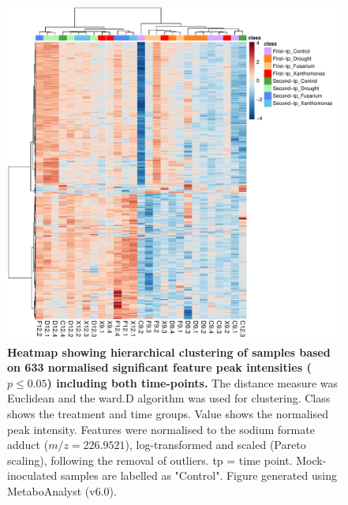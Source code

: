 \begin{figure}[p!]
  \centering
  \includegraphics[width=\textwidth]{Figures/Sig633FeaturesRedSamplesRedGroups_ForThesis.pdf}
  \caption[Heatmap showing hierarchical clustering of samples based on 633 normalised significant feature peak intensities ($p \le0.05$).]{\textbf{Heatmap showing hierarchical clustering of samples based on 633 normalised significant feature peak intensities ($p \le0.05$) including both time-points.} The distance measure was Euclidean and the ward.D algorithm was used for clustering. Class shows the treatment and time groups. Value shows the normalised peak intensity. Features were normalised to the sodium formate   adduct ($m/z=226.9521$), log-transformed and scaled (Pareto scaling), following the removal of outliers. tp = time point. Mock-inoculated samples are labelled as "Control". Figure generated using MetaboAnalyst (v6.0).}
  \label{fig:Sig657FeaturesRedSamples}
\end{figure}

